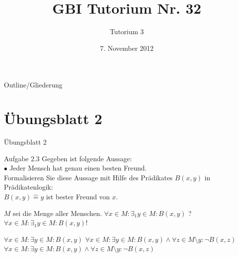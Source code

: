 

\title[Tutorium 3]{GBI Tutorium Nr. 32}
\subtitle{Tutorium 3}
\date{7. November 2012}






	\begin{frame}
		\titlepage
	\end{frame}

	\begin{frame}{Outline/Gliederung}
		\tableofcontents
	\end{frame}
	
	
	\section{\"Ubungsblatt 2}
	\begin{frame} {Übungsblatt 2}
		\begin{block} {Aufgabe 2.3}
			Gegeben ist folgende Aussage: \\
			\vspace{5pt}
			\hspace{10pt}$\bullet$ Jeder Mensch hat genau einen besten Freund.\\
			\vspace{5pt}
			Formalisieren Sie diese Aussage mit Hilfe des Prädikates $B(x,y)$ in Prädikatenlogik:\\
			$B(x,y)\mathrel{\widehat{=}} y$ ist bester Freund von $x$.
		\end{block}
		\begin{overprint}
			$M$ sei die Menge aller Menschen.
			\onslide<2> $\forall x \in M: \exists_1 y\in M:B(x,y)$ ?
			\onslide<3-> \color{red} $\forall x \in M: \exists_1 y\in M:B(x,y)$!\\
			
		\end{overprint}
		\begin{overprint}
			 $\forall x \in M: \exists y \in M: B(x,y)$
			\onslide<5> $\forall x \in M: \exists y \in M: B(x,y)\land \forall z \in  M \! \setminus \! y: \lnot B(x,z)$
			\onslide<6> \color{darkgreen}$\forall x \in M: \exists y \in M: B(x,y)\land \forall z \in  M \! \setminus \! y: \lnot B(x,z)$
		\end{overprint}
	
	\end{frame}	
		
	
